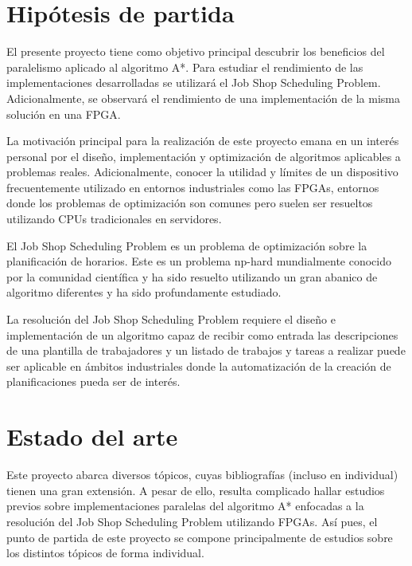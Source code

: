 
\section{Hipótesis de partida}

El presente proyecto tiene como objetivo principal descubrir los
beneficios del paralelismo aplicado al algoritmo A*.
Para estudiar el rendimiento de las implementaciones desarrolladas
se utilizará el Job Shop Scheduling Problem.
Adicionalmente, se observará el rendimiento de una implementación
de la misma solución en una FPGA.

La motivación principal para la realización de este proyecto
emana en un interés personal por el diseño, implementación y optimización
de algoritmos aplicables a problemas reales.
Adicionalmente, conocer la utilidad y límites de un dispositivo frecuentemente utilizado
en entornos industriales como las FPGAs, entornos donde los problemas
de optimización son comunes pero suelen ser resueltos utilizando
CPUs tradicionales en servidores.

El Job Shop Scheduling Problem es un problema de optimización
sobre la planificación de horarios.
Este es un problema np-hard mundialmente conocido
por la comunidad científica y
ha sido resuelto utilizando un gran abanico de algoritmo diferentes
y ha sido profundamente estudiado.

La resolución del Job Shop Scheduling Problem requiere el diseño e implementación de
un algoritmo capaz de recibir como entrada las descripciones de una plantilla
de trabajadores y un listado de trabajos y tareas a realizar puede ser
aplicable en ámbitos industriales donde la automatización de la creación
de planificaciones pueda ser de interés.

\pagebreak

\section{Estado del arte}

Este proyecto abarca diversos tópicos, cuyas bibliografías
(incluso en individual) tienen una gran extensión.
A pesar de ello, resulta complicado hallar estudios previos sobre implementaciones
paralelas del algoritmo A* enfocadas a la resolución del Job Shop Scheduling Problem
utilizando FPGAs.
Así pues, el punto de partida de este proyecto
se compone principalmente de estudios
sobre los distintos tópicos de forma individual.

